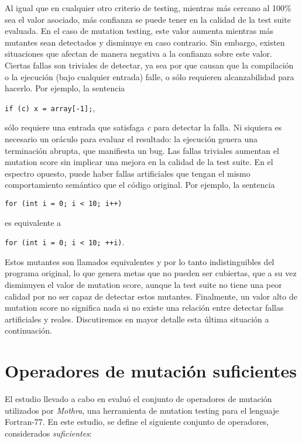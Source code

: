 Al igual que en cualquier otro criterio de testing, mientras m\'as cercano al 100\% sea el valor asociado, m\'as confianza se puede tener en la calidad de la test suite evaluada. En el caso de mutation testing, este valor aumenta mientras m\'as mutantes sean detectados y disminuye en caso contrario. Sin embargo, existen situaciones que afectan de manera negativa a la confianza sobre este valor. Ciertas fallas son triviales de detectar, ya sea por que causan que la compilaci\'on o la ejecuci\'on (bajo cualquier entrada) falle, o s\'olo requieren alcanzabilidad para hacerlo. Por ejemplo, la sentencia

 \lstinline|if (c) x = array[-1];|, 

\noindent
s\'olo requiere una entrada que satisfaga \emph{c} para detectar la falla. Ni siquiera es necesario un or\'aculo para evaluar el resultado: la ejecuci\'on genera una terminaci\'on abrupta, que manifiesta un bug. Las fallas triviales aumentan el mutation score sin implicar una mejora en la calidad de la test suite. En el espectro opuesto, puede haber fallas artificiales que tengan el mismo comportamiento sem\'antico que el c\'odigo original. Por ejemplo, la sentencia

 \lstinline|for (int i = 0; i < 10; i++)| 

\noindent
es equivalente a 

\lstinline|for (int i = 0; i < 10; ++i)|. 

\noindent
Estos mutantes son llamados equivalentes y por lo tanto indistinguibles del programa original, lo que genera metas que no pueden ser cubiertas, que a su vez disminuyen el valor de mutation score, aunque la test suite no tiene una peor calidad por no ser capaz de detectar estos mutantes. Finalmente, un valor alto de mutation score no significa nada si no existe una relaci\'on entre detectar fallas artificiales y reales. Discutiremos en mayor detalle esta \'ultima situaci\'on a continuaci\'on.

\section{Operadores de mutaci\'on suficientes}
\label{sec:preliminares.mutation.sufficient}

El estudio llevado a cabo en \cite{bibliography.mutation.selection.Offutt96} evalu\'o el conjunto de operadores de mutaci\'on utilizados por \emph{Mothra}, una herramienta de mutation testing para el lenguaje Fortran-77. En este estudio, se define el siguiente conjunto de operadores, considerados \emph{suficientes}:

